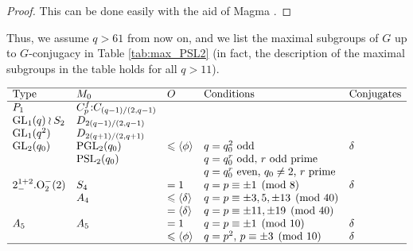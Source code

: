 \documentclass[twoside,a4paper,reqno,11pt]{amsart}
\newcommand{\<}{\langle}
\renewcommand{\>}{\rangle}
\newcommand{\la}{\langle}
\newcommand{\ra}{\rangle}
\newcommand{\leqs}{\leqslant}
\newcommand{\soc}{\mathrm{soc}}
\newcommand{\PSL}{\mathrm{PSL}}
\newcommand{\GL}{\mathrm{GL}}
\newcommand{\PGL}{\mathrm{PGL}}
\theoremstyle{definition}
\begin{document}
	\begin{proof}
		This can be done easily with the aid of {\sc Magma} \cite{Magma}.
	\end{proof}
	
	Thus, we assume $q > 61$ from now on, and we list the maximal subgroups of $G$ up to $G$-conjugacy in Table \ref{tab:max_PSL2} (in fact, the description of the maximal subgroups in the table holds for all $q > 11$).
	
	{\small
		\begin{table}
			\[
			\begin{array}{lllll} \hline
			\mbox{Type}&M_0&O&\mbox{Conditions}&\mbox{Conjugates}\\\hline
			P_1 & C_p^f{:}C_{(q-1)/(2,q-1)} & & &\\
			\GL_1(q)\wr S_2 & D_{2(q-1)/(2,q-1)} & & &\\
			\GL_1(q^2) & D_{2(q+1)/(2,q+1)} & & &\\
			\GL_2(q_0) & \PGL_2(q_0) & \leqs\la\phi\ra & \mbox{$q = q_0^2$ odd} &\delta\\
			& \PSL_2(q_0) & & \mbox{$q = q_0^r$ odd, $r$ odd prime} &\\
			& & & \mbox{$q = q_0^r$ even, $q_0\ne 2$, $r$ prime} &\\
			2^{1+2}_-.\mathrm{O}_2^-(2) & S_4 & =1 & \mbox{$q = p\equiv \pm 1\pmod 8$} & \delta \\
			& A_4 & \leqs\la\delta\ra & \mbox{$q = p\equiv \pm 3,5,\pm 13\pmod{40}$} &  \\
			& & =\la\delta\ra & \mbox{$q = p\equiv \pm 11, \pm 19\pmod{40}$} &  \\
			A_5 & A_5 & =1 & \mbox{$q = p\equiv \pm 1\pmod{10}$} & \delta \\
			& & \leqs\la \phi\ra & \mbox{$q = p^2$, $p\equiv \pm 3\pmod{10}$} & \delta \\
			\hline
			\end{array}
			\]
			\caption{Maximal subgroup $M$ of $G$ with $\soc(G) = \PSL_2(q)$ for $q > 61$}
			\label{tab:max_PSL2}
	\end{table}}
	
\end{document}
